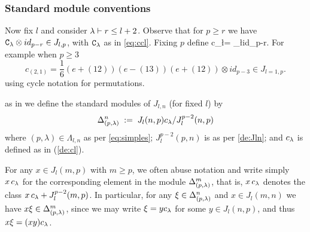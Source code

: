 \medskip  

\subsubsection{Standard module conventions}


\mdef 
Now fix $l$ and consider $\lambda \vdash r \leq l+2$. Observe that for $p \geq r$   %
we have ${\mathtt{C}}_\lambda \otimes id_{p-r} \in J_{l,p}$, with ${\mathtt{C}}_\lambda$ as in \eqref{eq:ccl}. 
Fixing $p$ define 
\beq   \label{de:cl}
c_\l = \nC_\l \otimes id_{p-r}.
\eq
For example when $p\geq 3$ %
\[
c_{(2,1)} = \frac{1}{6}(e+(1 2))(e-(1 3) )(e+(1  2))\otimes id_{p-3}\in J_{l=1,p}.
\]
using cycle notation for permutations.

\mdef\label{de:stdmods} 
as in \cite{KadarYu} 
we define the standard modules of $J_{l,n}$ (for fixed $l$) by 
\[
\Delta^{n}_{(p,\lambda)} \; := \; J_l(n,p)  c_\lambda / J_l^{p-2}(n,p)
\]
where $(p,\lambda) \in\Lambda_{l,n}$ as per \ref{eq:simples}; 
$J_l^{p-2}(p,n)$ is as per \ref{de:Jln};
and $c_\lambda$ is defined as in (\ref{de:cl}). 

\mdef \label{pa:convs}
For any $x\in J_l(m, p)$ with $m\geq p$, we often abuse notation and write simply $x \, c_\lambda$ for the corresponding element in the module $\Delta^{m}_{(p,\lambda)}$, 
that is, $x \, c_\lambda$ denotes the class $x \, c_\lambda+J_{l}^{p-2}(m,p)$. 
In particular, for any $\xi \in \Delta^{n}_{(p,\lambda)}$ 
and $x\in J_{l}(m,n)$ we have $x \xi \in \Delta^{m}_{(p,\lambda)}$, since we may write $\xi = y c_\lambda$ for some $y \in J_l(n,p)$, and thus $x \xi = (xy)c_\lambda$.

